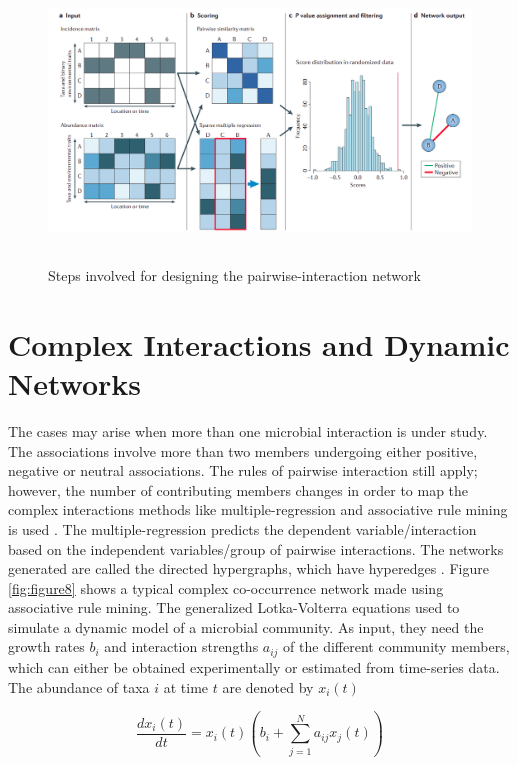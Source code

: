 \begin{figure}
  \centering
  \includegraphics[width=12cm, height=7.5cm] {../figures/Figure7.png}
  \caption{Steps involved for designing the pairwise-interaction network}
  \label{fig:figure7}
\end{figure}

\section{Complex Interactions and Dynamic Networks}
The cases may arise when more than one microbial interaction is under study. The associations involve more than two members undergoing either positive, negative or neutral associations. The rules of pairwise interaction still apply; however, the number of contributing members changes in order to map the complex interactions methods like multiple-regression and associative rule mining is used\cite{faust_2012_microbial} . The multiple-regression predicts the dependent variable/interaction based on the independent variables/group of pairwise interactions. The networks generated are called the directed hypergraphs, which have hyperedges \cite{faust_2012_microbial}. Figure \ref{fig:figure8} shows a typical complex co-occurrence network made using associative rule mining. The generalized Lotka-Volterra equations used to simulate a dynamic model of a microbial community. As input, they need the growth rates $b_{i}$ and interaction strengths $a_{ij}$ of the different community members, which can either be obtained experimentally or estimated from time-series data. The abundance of taxa $i$ at time $t$ are denoted by $x_{i}(t)$

$$\frac{dx_{i}(t)}{dt} = x_{i}(t)(b_{i} + \sum^{N}_{j=1}a_{ij}x_{j}(t))$$


